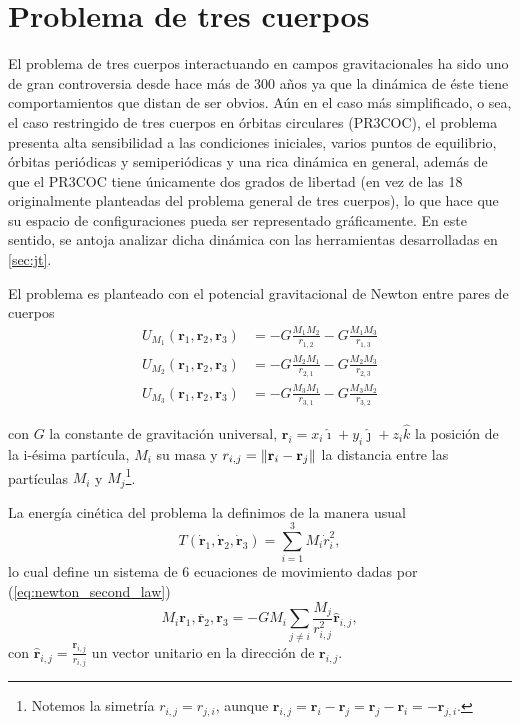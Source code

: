 \section{Problema de tres cuerpos}

El problema de tres cuerpos interactuando en campos gravitacionales ha sido uno de gran controversia desde hace más de 300 años ya que la dinámica de éste tiene comportamientos que distan de ser obvios. Aún en el caso más simplificado, o sea, el caso restringido de tres cuerpos en órbitas circulares (PR3COC), el problema presenta alta sensibilidad a las condiciones iniciales, varios puntos de equilibrio, órbitas periódicas y semiperiódicas y una rica dinámica en general, además de que el PR3COC tiene únicamente dos grados de libertad (en vez de las 18 originalmente planteadas del problema general de tres cuerpos), lo que hace que su espacio de configuraciones pueda ser representado gráficamente. En este sentido, se antoja analizar dicha dinámica con las herramientas desarrolladas en \ref{sec:jt}.

El problema es planteado con el potencial gravitacional de Newton entre pares de cuerpos 
\begin{align}
 U_{M_1}(\mathbf{r}_1,\mathbf{r}_2,\mathbf{r}_3) &= -G \frac{M_1 M_2}{r_{1,2}} - G \frac{M_1 M_3}{r_{1,3}} \\
 U_{M_2}(\mathbf{r}_1,\mathbf{r}_2,\mathbf{r}_3) &= -G \frac{M_2 M_1}{r_{2,1}} - G \frac{M_2 M_3}{r_{2,3}} \\
 U_{M_3}(\mathbf{r}_1,\mathbf{r}_2,\mathbf{r}_3) &= -G \frac{M_3 M_1}{r_{3,1}} - G \frac{M_3 M_2}{r_{3,2}}
 \label{eq:3body_potential}
\end{align}

con $G$ la constante de gravitación universal, $\mathbf{r}_i = x_i \hat{\imath} + y_i \hat{\jmath} + z_i \hat{k}$ la posición de la i-ésima partícula, $M_i$ su masa y $r_{i,j} = \left\lVert \mathbf{r}_i - \mathbf{r}_j\right\rVert$ la distancia entre las partículas $M_i$ y $M_j$\footnote{Notemos la simetría $r_{i,j} = r_{j,i}$, aunque $\mathbf{r}_{i,j} = \mathbf{r}_i - \mathbf{r}_j = \mathbf{r}_j - \mathbf{r}_i  = - \mathbf{r}_{j,i}$.}. 

La energía cinética del problema la definimos de la manera usual 
\begin{equation}
 T(\dot{\mathbf{r}}_1,\dot{\mathbf{r}}_2,\dot{\mathbf{r}}_3) = \sum_{i=1}^3 M_i \dot{r}_i^2,
 \label{eq:3body_cinetic}
\end{equation}
lo cual define un sistema de 6 ecuaciones de movimiento dadas por (\ref{eq:newton_second_law})
\begin{equation}
 M_i \ddot{\mathbf{r}_1,\mathbf{r}_2,\mathbf{r}_3} = - G M_i \sum_{j\neq i} \frac{M_j}{r_{i,j}^2} \hat{\mathbf{r}}_{i,j},
 \label{eq:3body_eqs_motion}
\end{equation}
con $\hat{\mathbf{r}}_{i,j} = \frac{\mathbf{r}_{i,j}}{r_{i,j}}$ un vector unitario en la dirección de $\mathbf{r}_{i,j}$.

